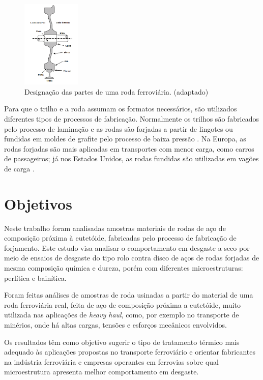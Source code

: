 \documentclass[
12pt,
openany, %
oneside, %
a4paper,			
english,			
brazil			        %
]{abntbibufjf}
\begin{document}
	\begin{figure}[H]
		\centering
		\includegraphics[width=0.25\textwidth]{roda}
		\caption{Designação das partes de uma roda ferroviária. \cite{okagata2013wheels} (adaptado)}
		\label{fig:roda}
	\end{figure}
	
	Para que o trilho e a roda assumam os formatos necessários, são utilizados diferentes tipos de processos de fabricação. Normalmente os trilhos são fabricados pelo processo de laminação e as rodas são forjadas a partir de lingotes ou fundidas em moldes de grafite pelo processo de baixa pressão \citep{paula2016desgaste}. Na Europa, as rodas forjadas são mais aplicadas em transportes com menor carga, como carros de passageiros; já nos Estados Unidos, as rodas fundidas são utilizadas em vagões de carga \citep{paula2016desgaste}.
	
	
	\section{Objetivos}
	
	Neste trabalho foram analisadas amostras materiais de rodas de aço de composição próxima à eutetóide, fabricadas pelo processo de fabricação de forjamento. Este estudo visa analisar o comportamento em desgaste a seco por meio de ensaios de desgaste do tipo rolo contra disco de aços de rodas forjadas de mesma composição química e dureza, porém com diferentes microestruturas: perlítica e bainítica. 
	
	Foram feitas análises de amostras de roda usinadas a partir do material de uma roda ferroviária real, feita de aço de composição próxima a eutetóide, muito utilizada nas aplicações de \textit{heavy haul}, como, por exemplo no transporte de minérios, onde há altas cargas, tensões e esforços mecânicos envolvidos. 
	
	Os resultados têm como objetivo sugerir o tipo de tratamento térmico mais adequado às aplicações propostas no transporte ferroviário e orientar fabricantes na indústria ferroviária e empresas operantes em ferrovias sobre qual microestrutura apresenta melhor comportamento em desgaste. 
	
\end{document}
